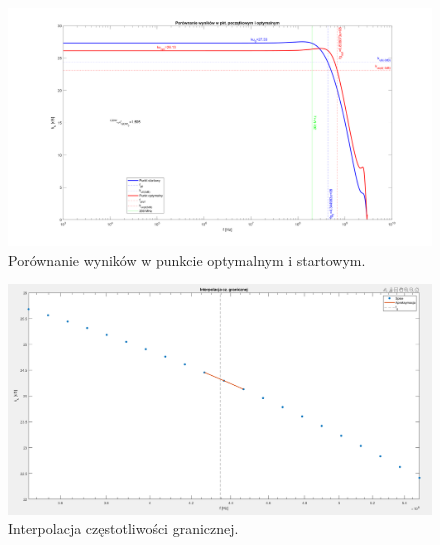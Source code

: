 \documentclass{article}
\begin{document}
\pagebreak
\begin{landscape}
	\begin{figure}[h]
		\vspace*{-2cm}
		\includegraphics[width=25cm,height=15 cm]{graphics/comparison.png}
		\centering
		\caption{Porównanie wyników w punkcie optymalnym i startowym.}
	\end{figure}
\end{landscape}

\pagebreak
\begin{landscape}
	\begin{figure}[h]
		\vspace*{-2cm}
		\includegraphics[width=20cm,height=10 cm]{graphics/fg_interp.png}
		\centering
		\caption{Interpolacja częstotliwości granicznej.}
	\end{figure}
\end{landscape}
\end{document}
